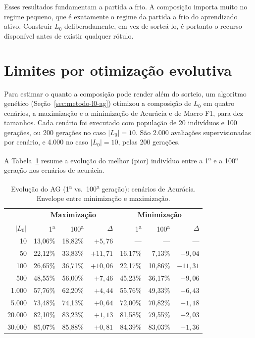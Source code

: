 Esses resultados fundamentam a partida a frio. A composição importa muito no
regime pequeno, que é exatamente o regime da partida a frio do aprendizado
ativo. Construir $L_0$ deliberadamente, em vez de sorteá-lo, é portanto o recurso
disponível antes de existir qualquer rótulo.

\section{Limites por otimização evolutiva}
\label{sec:res-l0-ag}

Para estimar o quanto a composição pode render além do sorteio, um algoritmo
genético (Seção~\ref{sec:metodo-l0-ag}) otimizou a composição de $L_0$ em
quatro cenários, a maximização e a minimização de Acurácia e de Macro F1,
para dez tamanhos. Cada cenário foi executado com população de 20 indivíduos e
100 gerações, ou 200 gerações no caso $|L_0|=10$. São 2.000 avaliações
supervisionadas por cenário, e 4.000 no caso $|L_0|=10$, pelas 200 gerações.

A Tabela~\ref{tab:ag-evolucao} resume a evolução do melhor (pior) indivíduo
entre a 1\textsuperscript{a} e a 100\textsuperscript{a} geração nos cenários
de acurácia.

\begin{table}[htb]
\centering
\caption{Evolução do AG (1\textsuperscript{a} vs.\ 100\textsuperscript{a}
geração): cenários de Acurácia. Envelope entre minimização e maximização.}
\label{tab:ag-evolucao}
\small
\begin{tabular}{r rrr rrr}
\toprule
 & \multicolumn{3}{c}{\textbf{Maximização}} & \multicolumn{3}{c}{\textbf{Minimização}} \\
\textbf{$|L_0|$} & 1\textsuperscript{a} & 100\textsuperscript{a} & $\Delta$ &
1\textsuperscript{a} & 100\textsuperscript{a} & $\Delta$ \\
\midrule
10     & 13,06\% & 18,82\% & $+5{,}76$ & —       & —       & — \\
50     & 22,12\% & 33,83\% & $+11{,}71$ & 16,17\% & 7,13\%  & $-9{,}04$ \\
100    & 26,65\% & 36,71\% & $+10{,}06$ & 22,17\% & 10,86\% & $-11{,}31$ \\
500    & 48,55\% & 56,00\% & $+7{,}46$  & 45,23\% & 36,17\% & $-9{,}06$ \\
1.000  & 57,76\% & 62,20\% & $+4{,}44$  & 55,76\% & 49,33\% & $-6{,}43$ \\
5.000  & 73,48\% & 74,13\% & $+0{,}64$  & 72,00\% & 70,82\% & $-1{,}18$ \\
20.000 & 82,10\% & 83,23\% & $+1{,}13$  & 81,58\% & 79,55\% & $-2{,}03$ \\
30.000 & 85,07\% & 85,88\% & $+0{,}81$  & 84,39\% & 83,03\% & $-1{,}36$ \\
\bottomrule
\end{tabular}
\end{table}

